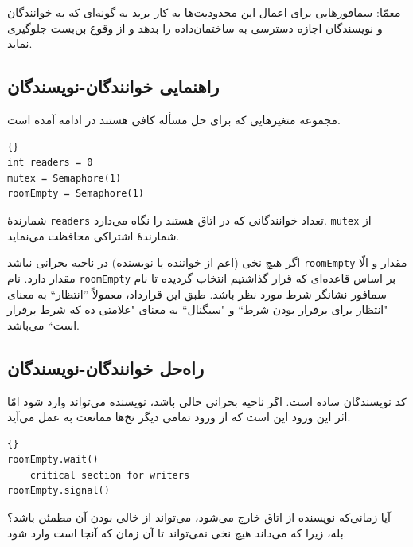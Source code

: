 \documentclass{book}
\newcommand{\clearemptydoublepage}{\newpage\cleardoublepage}
\begin{document}
    معمّا: سمافورهایی برای اعمال این محدودیت‌ها به کار برید به گونه‌ای که به خوانندگان و نویسندگان اجازه دسترسی به ساختمان‌داده را بدهد و 
    از  وقوع بن‌بست جلوگیری نماید. 


\clearemptydoublepage
\subsection{راهنمایی خوانندگان-نویسندگان}

    مجموعه متغیرهایی که برای حل مسأله کافی هستند در ادامه آمده است. 

\begin{latin}
\begin{lstlisting}[title=\rl{مقداردهی اولیه خوانندگان-نویسندگان}]{}
int readers = 0
mutex = Semaphore(1)
roomEmpty = Semaphore(1)
\end{lstlisting}
\end{latin}

    شمارندهٔ {\tt readers} تعداد خوانندگانی که در اتاق هستند را نگاه می‌دارد.  {\tt mutex} از شمارندهٔ اشتراکی محافظت می‌نماید. 

    
    اگر هیچ نخی (اعم از خواننده یا نویسنده) در ناحیه بحرانی نباشد {\tt roomEmpty}  مقدار   و الّا مقدار  دارد.
    نام {\tt roomEmpty}  بر اساس قاعده‌ای که قرار گذاشتیم انتخاب گردیده تا نام سمافور نشانگر شرط مورد نظر باشد. 
    طبق  این قرارداد، معمولاً ''انتظار`` به معنای "انتظار برای برقرار بودن شرط`` و "سیگنال`` به معنای "علامتی ده که شرط برقرار است`` می‌باشد. 


\clearemptydoublepage
\subsection{راه‌حل خوانندگان-نویسندگان}

    کد نویسندگان ساده است. اگر ناحیه بحرانی خالی باشد، نویسنده می‌تواند وارد شود امّا  اثر این ورود این است که از ورود تمامی دیگر نخ‌ها ممانعت 
    به عمل می‌آید. 

\begin{latin}
\begin{lstlisting}[title=\rl{ راه‌حل  نویسندگان}]{}
roomEmpty.wait()
    critical section for writers
roomEmpty.signal()
\end{lstlisting}
\end{latin}

    آیا زمانی‌که نویسنده از اتاق خارج می‌شود، می‌تواند از خالی بودن آن مطمئن باشد؟
    بله، زیرا که می‌داند هیچ نخی نمی‌تواند تا آن زمان که آنجا است وارد شود. 
\end{document}
